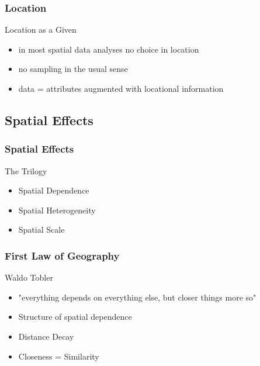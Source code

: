 \documentclass[nototal]{beamer}
\begin{document}
\begin{frame}
	\frametitle{Location}
 
\begin{block}{Location as a \alert{Given}}
 \begin{itemize}
 \item  in most spatial data analyses no choice in location
 \item  no sampling in the usual sense
 \item  data = attributes augmented with \alert{locational} information
 \end{itemize}
 \end{block} \end{frame} 

 \subsection{Spatial Effects}

\begin{frame}
	\frametitle{Spatial Effects}
 
\begin{block}{The Trilogy}
 \begin{itemize}
 \item Spatial Dependence
 \item Spatial Heterogeneity
 \item Spatial Scale
 \end{itemize}
 \end{block} \end{frame} 

\begin{frame}
	\frametitle{First Law of Geography}
 
\begin{block}{Waldo Tobler}
 \begin{itemize}
 \item	"everything depends on everything else, but closer things more so"
 \item	Structure of spatial dependence
 \item	Distance Decay
 \item	Closeness = Similarity
 \end{itemize}
 \end{block} \end{frame} 
\end{document}
